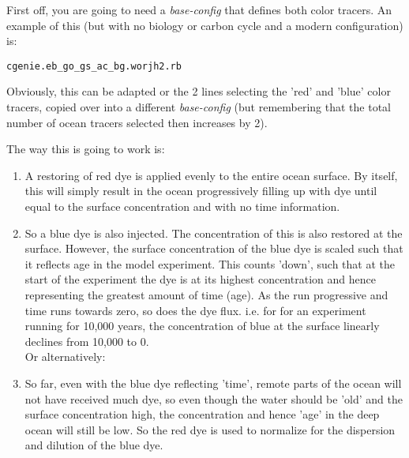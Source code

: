 First off, you are going to need a \textit{base-config} that defines both color tracers. An example of this (but with no biology or carbon cycle and a modern configuration) is:
\vspace{-1mm}\small\begin{verbatim}
cgenie.eb_go_gs_ac_bg.worjh2.rb
\end{verbatim}\normalsize\vspace{-1mm}
Obviously, this can be adapted or the 2 lines selecting the 'red' and 'blue' color tracers, copied over into a different \textit{base-config} (but remembering that the total number of ocean tracers selected then increases by 2).

\vspace{1mm}
The way this is going to work is:

\begin{enumerate}
\setlength{\itemindent}{.2in}

\vspace{1mm}
\item A restoring of red dye is applied evenly to the entire ocean surface. By itself, this will simply result in the ocean progressively filling up with dye until equal to the surface concentration and with no time information.

\vspace{1mm}
\item So a blue dye is also injected. The concentration of this is also restored at the surface. However, the surface concentration of the blue dye is scaled such that it reflects age in the model experiment. This counts 'down', such that at the start of the experiment the dye is at its highest concentration and hence representing the greatest amount of time (age). As the run progressive and time runs towards zero, so does the dye flux. i.e. for for an experiment running for 10,000 years, the concentration of blue at the surface linearly declines from 10,000 to 0.
\\Or alternatively:

\vspace{1mm}
\item So far, even with the blue dye reflecting 'time', remote parts of the ocean will not have received much dye, so even though the water should be 'old' and the surface concentration high, the concentration and hence 'age' in the deep ocean will still be low. So the red dye is used to normalize for the dispersion and dilution of the blue dye.

\end{enumerate}
\vspace{2mm}

